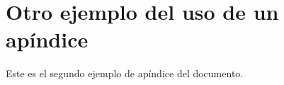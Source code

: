 \chapter{Otro ejemplo del uso de un apíndice}

Este es el segundo ejemplo de apíndice del documento. 